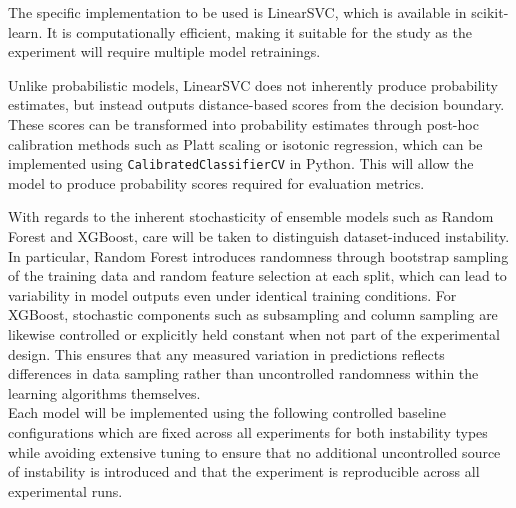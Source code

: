 \documentclass[12pt]{article}
\begin{document}
\begin{enumerate}
  The specific implementation to be used is LinearSVC, which is available in scikit-learn. It is computationally efficient, making it suitable for the study as the experiment will require multiple model retrainings.

  Unlike probabilistic models, LinearSVC does not inherently produce probability estimates, but instead outputs distance-based scores from the decision boundary. These scores can be transformed into probability estimates through post-hoc calibration methods such as Platt scaling or isotonic regression, which can be implemented using \texttt{CalibratedClassifierCV} in Python. This will allow the model to produce probability scores required for evaluation metrics.
\end{enumerate}

With regards to the inherent stochasticity of ensemble models such as Random Forest and XGBoost, care will be taken to distinguish dataset-induced instability. In particular, Random Forest introduces randomness through bootstrap sampling of the training data and random feature selection at each split, which can lead to variability in model outputs even under identical training conditions. For XGBoost, stochastic components such as subsampling and column sampling are likewise controlled or explicitly held constant when not part of the experimental design. This ensures that any measured variation in predictions reflects differences in data sampling rather than uncontrolled randomness within the learning algorithms themselves. \\

Each model will be implemented using the following controlled baseline configurations which are fixed across all experiments for both instability types while avoiding extensive tuning to ensure that no additional uncontrolled source of instability is introduced and that the experiment is reproducible across all experimental runs.
\end{document}
